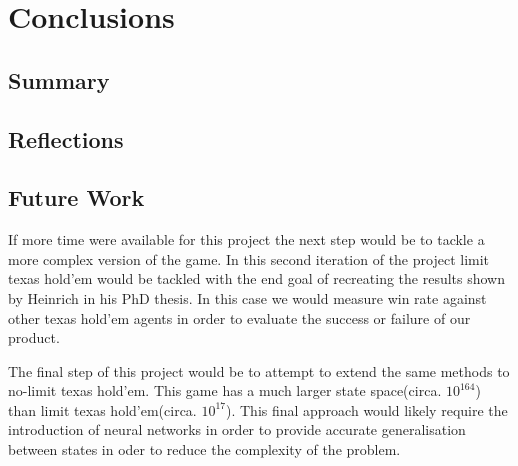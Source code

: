 \chapter{Conclusions}
\label{ch:conclusions}

\section{Summary}
\label{sec:summary}

\section{Reflections}
\label{sec:reflections}

\section{Future Work}\label{sec:futureWork}

If more time were available for this project the next step would be to tackle a more complex version of the game.
In this second iteration of the project limit texas hold'em would be tackled with the end goal of recreating
the results shown by Heinrich in his PhD thesis\citep{heinrich2017reinforcement}.
In this case we would measure win rate against other texas hold'em agents in order to evaluate
the success or failure of our product.

The final step of this project would be to attempt to extend the same methods to no-limit texas hold'em.
This game has a much larger state space(circa. $10^{164}$) than limit texas hold'em(circa. $10^{17}$).
This final approach would likely require the introduction of neural networks in order to provide accurate
generalisation between states in oder to reduce the complexity of the problem.